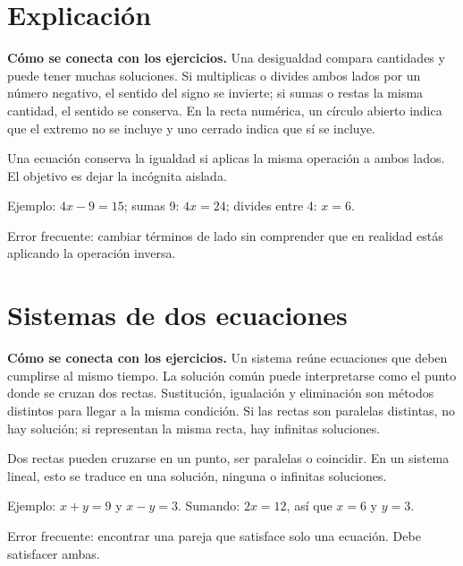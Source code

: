 \documentclass[10pt,oneside,openany]{book}
\begin{document}
\section{Explicación}

\textbf{Cómo se conecta con los ejercicios.} Una desigualdad compara cantidades y puede tener muchas soluciones. Si multiplicas o divides ambos lados por un número negativo, el sentido del signo se invierte; si sumas o restas la misma cantidad, el sentido se conserva. En la recta numérica, un círculo abierto indica que el extremo no se incluye y uno cerrado indica que sí se incluye.

Una ecuación conserva la igualdad si aplicas la misma operación a ambos lados. El objetivo es dejar la incógnita aislada.



\begin{ejemplo}
Ejemplo: $4x-9=15$; sumas 9: $4x=24$; divides entre 4: $x=6$.
\end{ejemplo}

\begin{ojo}
Error frecuente: cambiar términos de lado sin comprender que en realidad estás aplicando la operación inversa.
\end{ojo}



\section{Sistemas de dos ecuaciones}

\textbf{Cómo se conecta con los ejercicios.} Un sistema reúne ecuaciones que deben cumplirse al mismo tiempo. La solución común puede interpretarse como el punto donde se cruzan dos rectas. Sustitución, igualación y eliminación son métodos distintos para llegar a la misma condición. Si las rectas son paralelas distintas, no hay solución; si representan la misma recta, hay infinitas soluciones.

Dos rectas pueden cruzarse en un punto, ser paralelas o coincidir. En un sistema lineal, esto se traduce en una solución, ninguna o infinitas soluciones.

\begin{ejemplo}
Ejemplo: $x+y=9$ y $x-y=3$. Sumando: $2x=12$, así que $x=6$ y $y=3$.
\end{ejemplo}

\begin{ojo}
Error frecuente: encontrar una pareja que satisface solo una ecuación. Debe satisfacer ambas.
\end{ojo}
\end{document}

